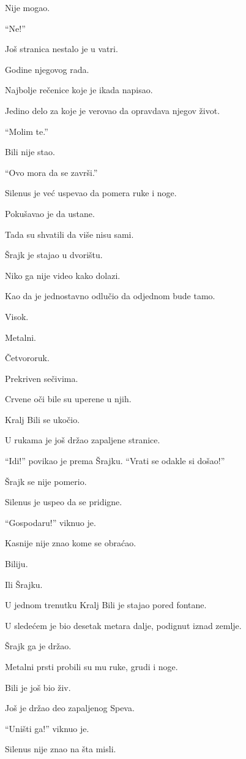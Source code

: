 Nije mogao.

``Ne!''

Još stranica nestalo je u vatri.

Godine njegovog rada.

Najbolje rečenice koje je ikada napisao.

Jedino delo za koje je verovao da opravdava njegov život.

``Molim te.''

Bili nije stao.

``Ovo mora da se završi.''

Silenus je već uspevao da pomera ruke i noge.

Pokušavao je da ustane.

Tada su shvatili da više nisu sami.

\bigskip

Šrajk je stajao u dvorištu.

Niko ga nije video kako dolazi.

Kao da je jednostavno odlučio da odjednom bude tamo.

Visok.

Metalni.

Četvororuk.

Prekriven sečivima.

Crvene oči bile su uperene u njih.

Kralj Bili se ukočio.

U rukama je još držao zapaljene stranice.

``Idi!'' povikao je prema Šrajku. ``Vrati se odakle si došao!''

Šrajk se nije pomerio.

Silenus je uspeo da se pridigne.

``Gospodaru!'' viknuo je.

Kasnije nije znao kome se obraćao.

Biliju.

Ili Šrajku.

U jednom trenutku Kralj Bili je stajao pored fontane.

U sledećem je bio desetak metara dalje, podignut iznad zemlje.

Šrajk ga je držao.

Metalni prsti probili su mu ruke, grudi i noge.

Bili je još bio živ.

Još je držao deo zapaljenog Speva.

``Uništi ga!'' viknuo je.

Silenus nije znao na šta misli.

